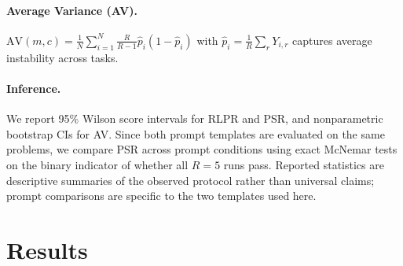 \documentclass[11pt]{article}
\begin{document}
\paragraph{Average Variance (AV).}
$\mathrm{AV}(m,c)=\frac{1}{N}\sum_{i=1}^{N} \frac{R}{R-1}\hat{p}_i(1-\hat{p}_i)$ with $\hat{p}_i=\frac{1}{R}\sum_r Y_{i,r}$ captures average instability across tasks.

\paragraph{Inference.}
We report 95\% Wilson score intervals for RLPR and PSR, and nonparametric bootstrap CIs for AV. Since both prompt templates are evaluated on the same problems, we compare PSR across prompt conditions using exact McNemar tests on the binary indicator of whether all $R=5$ runs pass. Reported statistics are descriptive summaries of the observed protocol rather than universal claims; prompt comparisons are specific to the two templates used here.

\section{Results}
\end{document}
